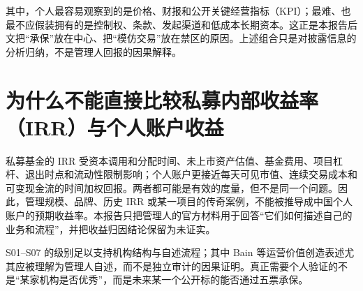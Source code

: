 其中，个人最容易观察到的是价格、财报和公开关键经营指标（KPI）；最难、也最不应假装拥有的是控制权、条款、发起渠道和低成本长期资本。这正是本报告后文把“承保”放在中心、把“模仿交易”放在禁区的原因。上述组合只是对披露信息的分析归纳，不是管理人回报的因果解释。

\section{为什么不能直接比较私募内部收益率（IRR）与个人账户收益}

私募基金的 IRR 受资本调用和分配时间、未上市资产估值、基金费用、项目杠杆、退出时点和流动性限制影响；个人账户更接近每天可见市值、连续交易成本和可变现金流的时间加权回报。两者都可能是有效的度量，但不是同一个问题。因此，管理规模、品牌、历史 IRR 或某一项目的传奇案例，不能被推导成中国个人账户的预期收益率。本报告只把管理人的官方材料用于回答“它们如何描述自己的业务和流程”，并把收益归因结论保留为未证实。

\begin{sourcequalitybox}[证据边界]
S01--S07 的级别足以支持机构结构与自述流程；其中 Bain 等运营价值创造表述尤其应被理解为管理人自述，而不是独立审计的因果证明。真正需要个人验证的不是“某家机构是否优秀”，而是未来某一个公开标的能否通过五票承保。
\end{sourcequalitybox}
